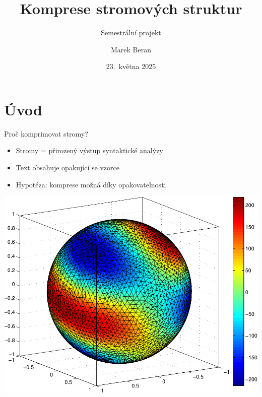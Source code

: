 \documentclass[lualatex,hyperref={pdfencoding=auto}]{beamer}
\title[Komprese stromových struktur]{Komprese stromových struktur}
\subtitle{Semestrální projekt}
\author{Marek Beran}
\institute[VŠB-TUO]{VŠB -- Technická univerzita Ostrava\\\vspace{2mm}marek.beran.st@vsb.cz}
\date[23.~5.~2025]{23.~května 2025}
\begin{document}
\begin{frame}
\tableofcontents
\end{frame}

\section{Úvod}
\begin{frame}{Proč komprimovat stromy?}
\begin{itemize}
  \item Stromy = přirozený výstup syntaktické analýzy
  \item Text obsahuje opakující se vzorce
  \item Hypotéza: komprese možná díky opakovatelnosti
\end{itemize}
\includegraphics[width=\textwidth]{fig/sphere_mix_real.pdf}
\end{frame}
\end{document}
